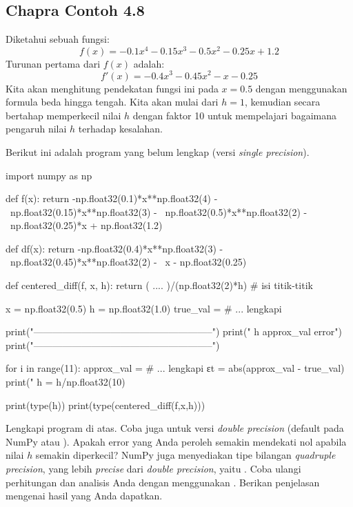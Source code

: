 \subsection{Chapra Contoh 4.8}
Diketahui sebuah fungsi:
\begin{equation}
f(x) = -0.1x^4 - 0.15x^3 - 0.5x^2 - 0.25x + 1.2
\end{equation}
Turunan pertama dari $f(x)$ adalah:
\begin{equation}
f'(x) = -0.4x^3 - 0.45x^2 - x - 0.25
\end{equation}
Kita akan menghitung pendekatan fungsi ini pada $x=0.5$ dengan menggunakan
formula beda hingga tengah. Kita akan mulai dari $h=1$, kemudian secara bertahap
memperkecil nilai $h$ dengan faktor 10 untuk mempelajari bagaimana
pengaruh nilai $h$ terhadap kesalahan.

Berikut ini adalah program yang belum lengkap (versi \textit{single precision}).
\begin{pythoncode}
import numpy as np
  
def f(x):
    return -np.float32(0.1)*x**np.float32(4) - \
      np.float32(0.15)*x**np.float32(3) - \
      np.float32(0.5)*x**np.float32(2) - \
      np.float32(0.25)*x + np.float32(1.2)
    
def df(x):
    return -np.float32(0.4)*x**np.float32(3) - \
      np.float32(0.45)*x**np.float32(2) - \
      x - np.float32(0.25)
    
def centered_diff(f, x, h):
    return ( .... )/(np.float32(2)*h) # isi titik-titik
  
    x = np.float32(0.5)
    h = np.float32(1.0)
    true_val = # ... lengkapi
  
    print("--------------------------------------------------------")
    print("           h             approx_val             error")
    print("--------------------------------------------------------")
    
for i in range(11):
    approx_val = # ... lengkapi
    εt = abs(approx_val - true_val)
    print("%
    h = h/np.float32(10)

print(type(h))
print(type(centered_diff(f,x,h)))  
\end{pythoncode}

\begin{soal}
Lengkapi program di atas.
Coba juga untuk versi \textit{double precision} (default pada NumPy
atau ).
Apakah error yang Anda peroleh semakin mendekati nol apabila nilai $h$ semakin
diperkecil?
NumPy juga menyediakan tipe bilangan \textit{quadruple precision}, yang lebih
\textit{precise} dari \textit{double precision}, yaitu
\txtinline{np.float128}. Coba ulangi perhitungan dan analisis Anda dengan
menggunakan \txtinline{np.float128}.
Berikan penjelasan mengenai hasil yang Anda dapatkan.
\end{soal}